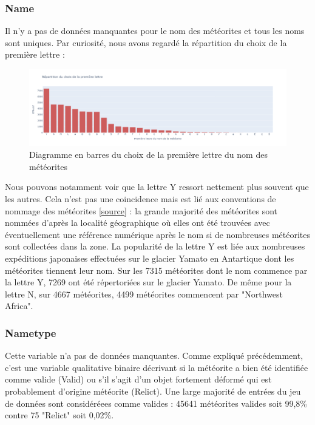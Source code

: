 \documentclass[12pt]{article}
\begin{document}
\subsubsection*{Name}
Il n'y a pas de données manquantes pour le nom des météorites et tous les noms sont uniques. Par curiosité, nous avons regardé la répartition du choix de la première lettre :
\begin{figure}[H]
\centering
\includegraphics[width=15cm]{Images/exploration/name_barplot_lettres.png}
\caption{Diagramme en barres du choix de la première lettre du nom des météorites}
\end{figure}
Nous pouvons notamment voir que la lettre Y ressort nettement plus souvent que les autres. Cela n'est pas une coincidence mais est lié aux conventions de nommage des météorites [\href{https://www.lpi.usra.edu/meteor/docs/nc-guidelines-2015-february.htm}{source}] : la grande majorité des météorites sont nommées d'après la localité géographique où elles ont été trouvées avec éventuellement une référence numérique après le nom si de nombreuses météorites sont collectées dans la zone. La popularité de la lettre Y est liée aux nombreuses expéditions japonaises effectuées sur le glacier Yamato en Antartique dont les météorites tiennent leur nom. Sur les 7315 météorites dont le nom commence par la lettre Y, 7269 ont été répertoriées sur le glacier Yamato. De même pour la lettre N, sur 4667 météorites, 4499 météorites commencent par "Northwest Africa".
\subsubsection*{Nametype}
Cette variable n'a pas de données manquantes. Comme expliqué précédemment, c'est une variable qualitative binaire décrivant si la météorite a bien été identifiée comme valide (Valid) ou s'il s'agit d'un objet fortement déformé qui est probablement d'origine météorite (Relict). Une large majorité de entrées du jeu de données sont considéréees comme valides : 45641 météorites valides soit 99,8\% contre 75 "Relict" soit 0,02\%.
\end{document}
